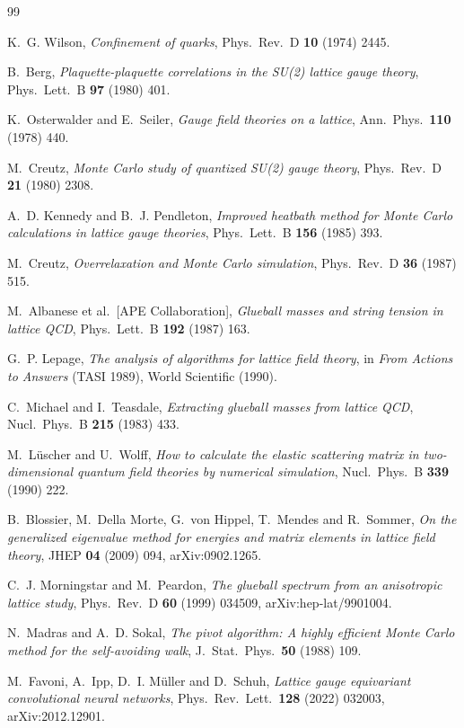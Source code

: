 \documentclass[11pt,a4paper]{article}
\begin{document}
\begin{thebibliography}{99}

K.~G. Wilson,
\emph{Confinement of quarks},
Phys.\ Rev.\ D \textbf{10} (1974) 2445.

B.~Berg,
\emph{Plaquette-plaquette correlations in the SU(2) lattice gauge theory},
Phys.\ Lett.\ B \textbf{97} (1980) 401.

K.~Osterwalder and E.~Seiler,
\emph{Gauge field theories on a lattice},
Ann.\ Phys.\ \textbf{110} (1978) 440.

M.~Creutz,
\emph{Monte Carlo study of quantized SU(2) gauge theory},
Phys.\ Rev.\ D \textbf{21} (1980) 2308.

A.~D. Kennedy and B.~J. Pendleton,
\emph{Improved heatbath method for Monte Carlo calculations in lattice gauge
theories},
Phys.\ Lett.\ B \textbf{156} (1985) 393.

M.~Creutz,
\emph{Overrelaxation and Monte Carlo simulation},
Phys.\ Rev.\ D \textbf{36} (1987) 515.

M.~Albanese et al.\ [APE Collaboration],
\emph{Glueball masses and string tension in lattice QCD},
Phys.\ Lett.\ B \textbf{192} (1987) 163.

G.~P. Lepage,
\emph{The analysis of algorithms for lattice field theory},
in \emph{From Actions to Answers} (TASI 1989), World Scientific (1990).

C.~Michael and I.~Teasdale,
\emph{Extracting glueball masses from lattice QCD},
Nucl.\ Phys.\ B \textbf{215} (1983) 433.

M.~L\"uscher and U.~Wolff,
\emph{How to calculate the elastic scattering matrix in two-dimensional
quantum field theories by numerical simulation},
Nucl.\ Phys.\ B \textbf{339} (1990) 222.

B.~Blossier, M.~Della Morte, G.~von Hippel, T.~Mendes and R.~Sommer,
\emph{On the generalized eigenvalue method for energies and matrix elements
in lattice field theory},
JHEP \textbf{04} (2009) 094, arXiv:0902.1265.

C.~J. Morningstar and M.~Peardon,
\emph{The glueball spectrum from an anisotropic lattice study},
Phys.\ Rev.\ D \textbf{60} (1999) 034509, arXiv:hep-lat/9901004.

N.~Madras and A.~D. Sokal,
\emph{The pivot algorithm: A highly efficient Monte Carlo method for the
self-avoiding walk},
J.\ Stat.\ Phys.\ \textbf{50} (1988) 109.

M.~Favoni, A.~Ipp, D.~I. M\"uller and D.~Schuh,
\emph{Lattice gauge equivariant convolutional neural networks},
Phys.\ Rev.\ Lett.\ \textbf{128} (2022) 032003, arXiv:2012.12901.

\end{thebibliography}
\end{document}
